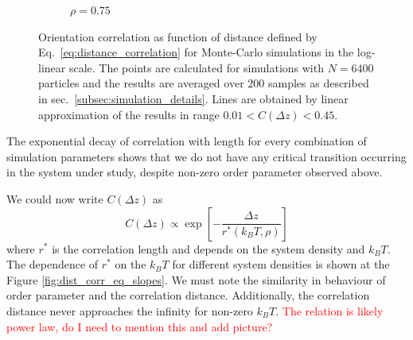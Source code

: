 \begin{figure}[h]
\begin{subfigure}[t]{0.32\textwidth}
	\caption{$\rho = 0.75$}
\end{subfigure}
	\captionsetup{justification=centering, width=0.9\columnwidth}
	\caption{Orientation correlation as function of distance defined by Eq.~\eqref{eq:distance_correlation} for Monte-Carlo simulations in the log-linear scale. The points are calculated for simulations with $N = 6400$ particles and the results are averaged over $200$ samples as described in sec.~\ref{subsec:simulation_details}. Lines are obtained by linear approximation of the results in range $0.01 < C(\Delta z) < 0.45$.}
	\label{fig:dist_corr_eq}
\end{figure}

The exponential decay of correlation with length for every combination of simulation parameters shows that we do not have any critical transition occurring in the system under study, despite non-zero order parameter observed above.

We could now write $C(\Delta z)$ as
\begin{equation}
	\label{eq:slopes_def}
	C(\Delta z) \propto \exp\left[-\frac{\Delta z}{r^*(k_BT, \rho)} \right]
\end{equation}
where $r^*$ is the correlation length and depends on the system density and $k_BT$. The dependence of $r^*$ on the $k_BT$ for different system densities is shown at the Figure \ref{fig:dist_corr_eq_slopes}. We must note the similarity in behaviour of order parameter and the correlation distance. Additionally, the correlation distance never approaches the infinity for non-zero $k_BT$. \textcolor{red}{The relation is likely power law, do I need to mention this and add picture?}


